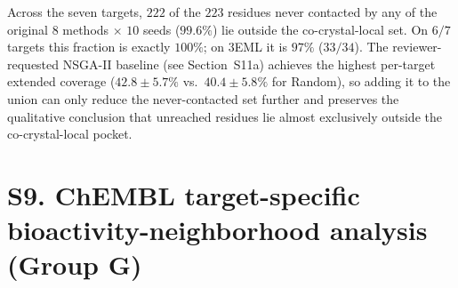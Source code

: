 \documentclass[journal=jcisd8,manuscript=suppinfo]{achemso}
\begin{document}
Across the seven targets, $222$ of the $223$ residues never contacted by any of the original $8$ methods $\times$ $10$ seeds ($99.6\%$) lie outside the co-crystal-local set. On $6/7$ targets this fraction is exactly $100\%$; on 3EML it is $97\%$ ($33/34$). The reviewer-requested NSGA-II baseline (see Section~S11a) achieves the highest per-target extended coverage ($42.8 \pm 5.7\%$ vs.\ $40.4 \pm 5.8\%$ for Random), so adding it to the union can only reduce the never-contacted set further and preserves the qualitative conclusion that unreached residues lie almost exclusively outside the co-crystal-local pocket.

\section*{S9. ChEMBL target-specific bioactivity-neighborhood analysis (Group G)}

\begin{table}[ht]
\centering
\caption{ChEMBL target mapping and active-set counts. Activities were retrieved from the ChEMBL REST API on 2026-07-17 and filtered to \texttt{assay\_type = B}, \texttt{standard\_relation = ``=''}, and $p\mathrm{ChEMBL} \geq 6$. 3V8D (CYP7A1) is excluded from downstream analyses because ChEMBL contains no binding-assay activity records for this metabolic P450 at the specified threshold. \emph{Homology-based mapping:} For 1EVE (crystallized \emph{Tetronarce californica} AChE) and 4DFR (crystallized \emph{E.\ coli} DHFR), the ChEMBL target was chosen from a well-populated homologous species (P22303 / CHEMBL220 human AChE; P00378 / CHEMBL2575 vertebrate DHFR) because the exact-species ChEMBL records (CHEMBL4780 \emph{T.\ californica} AChE; CHEMBL1809 \emph{E.\ coli} DHFR) have substantially fewer curated activities. Relative-method comparisons are unaffected because all methods on a given target are scored against the same reference set.}
\label{tab:chembl_targets}
\end{table}
\end{document}
